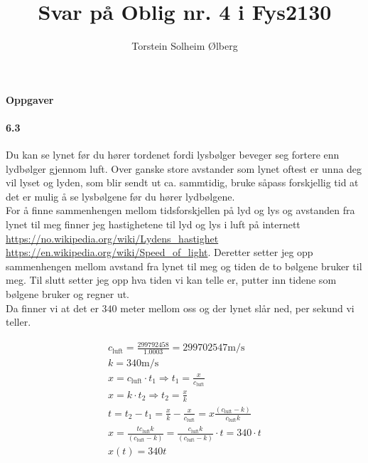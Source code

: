 \documentclass[11pt, A4paper,norsk]{article}
\author{Torstein Solheim Ølberg}
\title{Svar på Oblig nr. 4 i Fys2130}
\begin{document}
\maketitle
	\begin{center}
\Large \textbf{Oppgaver}
	\end{center}









		\paragraph{6.3}
			\begin{flushleft}
Du kan se lynet før du hører tordenet fordi lysbølger beveger seg fortere enn lydbølger gjennom luft. Over ganske store avstander som lynet oftest er unna deg vil lyset og lyden, som blir sendt ut ca. sammtidig, bruke såpass forskjellig tid at det er mulig å se lysbølgene før du hører lydbølgene. \\
For å finne sammenhengen mellom tidsforskjellen på lyd og lys og avstanden fra lynet til meg finner jeg hastighetene til lyd og lys i luft på internett \url{https://no.wikipedia.org/wiki/Lydens_hastighet} \url{https://en.wikipedia.org/wiki/Speed_of_light}. Deretter setter jeg opp sammenhengen mellom avstand fra lynet til meg og tiden de to bølgene bruker til meg. Til slutt setter jeg opp hva tiden vi kan telle er, putter inn tidene som bølgene bruker og regner ut. \\
Da finner vi at det er $340$ meter mellom oss og der lynet slår ned, per sekund vi teller.
			\end{flushleft}
			\begin{gather*}
c_{\text{luft}} = \frac{299792458}{1.0003} = 299702547 \text{m} / \text{s} \\
k = 340 \text{m} / \text{s} \\
x = c_{\text{luft}} \cdot t_1 \Rightarrow t_1 = \frac{x}{c_{\text{luft}}} \\
x = k \cdot t_2 \Rightarrow t_2 = \frac{x}{k} \\
t = t_2 - t_1 = \frac{x}{k} - \frac{x}{c_{\text{luft}}} = x \frac{(c_{\text{luft}} - k)}{c_{\text{luft}}k} \\
x = \frac{tc_{\text{luft}}k}{(c_{\text{luft}} - k)} = \frac{c_{\text{luft}}k}{(c_{\text{luft}} - k)} \cdot t = 340 \cdot t \\
x(t) = 340t
			\end{gather*}
\end{document}
